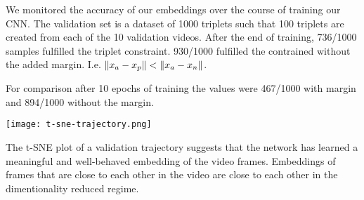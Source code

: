 
We monitored the accuracy of our embeddings over the course of training our CNN. The validation set is a dataset of 1000 triplets such that 100 triplets are created from each of the 10 validation videos. After the end of training, 736/1000 samples fulfilled the triplet constraint. 930/1000 fulfilled the contrained without the added margin. I.e. $\left\lVert x_a - x_p\right\rVert < \left\lVert x_a - x_n\right\rVert$.

For comparison after 10 epochs of training the values were 467/1000 with margin and 894/1000 without the margin.

{
    \label{example-snap}
    \centering
    \texttt{[image: t-sne-trajectory.png]}
    \vspace{0.5cm}
}

The t-SNE plot of a validation trajectory suggests that the network has learned a meaningful and well-behaved embedding of the video frames. Embeddings of frames that are close to each other in the video are close to each other in the dimentionality reduced regime.


